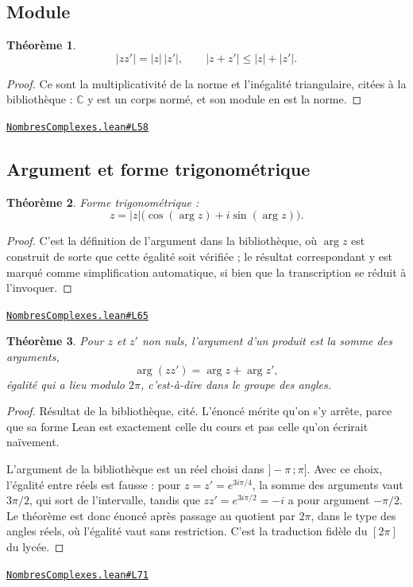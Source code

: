 \documentclass[11pt,a4paper]{article}
\theoremstyle{definition}
\theoremstyle{plain}
\newtheorem{theoreme}{Théorème}
\newcommand{\source}[2]{\par\smallskip\noindent\hfill{\footnotesize\href{#1}{\texttt{#2}}}\par\smallskip}
\begin{document}
\subsection{Module}

\begin{theoreme}
\[ |zz'| = |z|\,|z'| , \qquad |z + z'| \le |z| + |z'| . \]
\end{theoreme}

\begin{proof}
Ce sont la multiplicativité de la norme et l'inégalité triangulaire, citées à la
bibliothèque : $\mathbb{C}$ y est un corps normé, et son module en est la norme.
\end{proof}
\source{https://github.com/Commutator-IO/learn-lean/blob/main/cours/02-lycee/07-nombres-complexes/NombresComplexes.lean\#L58}{NombresComplexes.lean\#L58}

\subsection{Argument et forme trigonométrique}

\begin{theoreme}
Forme trigonométrique :
\[ z = |z|\bigl(\cos(\arg z) + i \sin(\arg z)\bigr) . \]
\end{theoreme}

\begin{proof}
C'est la définition de l'argument dans la bibliothèque, où $\arg z$ est construit de sorte
que cette égalité soit vérifiée ; le résultat correspondant y est marqué comme
simplification automatique, si bien que la transcription se réduit à l'invoquer.
\end{proof}
\source{https://github.com/Commutator-IO/learn-lean/blob/main/cours/02-lycee/07-nombres-complexes/NombresComplexes.lean\#L65}{NombresComplexes.lean\#L65}

\begin{theoreme}
Pour $z$ et $z'$ non nuls, l'argument d'un produit est la somme des arguments,
\[ \arg(zz') = \arg z + \arg z' , \]
égalité qui a lieu \emph{modulo} $2\pi$, c'est-à-dire dans le groupe des angles.
\end{theoreme}

\begin{proof}
Résultat de la bibliothèque, cité. L'énoncé mérite qu'on s'y arrête, parce que sa forme
Lean est exactement celle du cours et pas celle qu'on écrirait naïvement.

L'argument de la bibliothèque est un réel choisi dans $]-\pi\,;\pi]$. Avec ce choix,
l'égalité entre réels est fausse : pour $z = z' = e^{3i\pi/4}$, la somme des arguments vaut
$3\pi/2$, qui sort de l'intervalle, tandis que $zz' = e^{3i\pi/2} = -i$ a pour argument
$-\pi/2$. Le théorème est donc énoncé après passage au quotient par $2\pi$, dans le type
des angles réels, où l'égalité vaut sans restriction. C'est la traduction fidèle du
\og{} $[2\pi]$ \fg{} du lycée.
\end{proof}
\source{https://github.com/Commutator-IO/learn-lean/blob/main/cours/02-lycee/07-nombres-complexes/NombresComplexes.lean\#L71}{NombresComplexes.lean\#L71}
\end{document}
